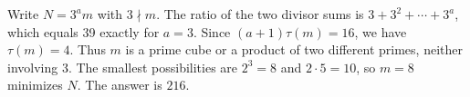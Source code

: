 Write $N=3^a m$ with $3\nmid m$. The ratio of the two divisor sums is $3+3^2+\cdots+3^a$, which equals 39 exactly for $a=3$. Since $(a+1)\tau(m)=16$, we have $\tau(m)=4$. Thus $m$ is a prime cube or a product of two different primes, neither involving 3. The smallest possibilities are $2^3=8$ and $2\cdot5=10$, so $m=8$ minimizes $N$. The answer is $\boxed{216}$.

